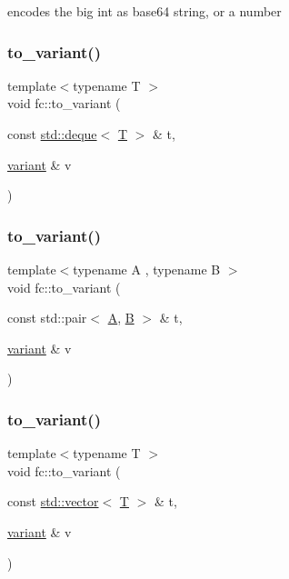 encodes the big int as base64 string, or a number \mbox{\label{namespacefc_ad2c253eb956ce0781fde7ce73d3ff1c8}} 
\subsubsection{\texorpdfstring{to\+\_\+variant()}{to\_variant()}\hspace{0.1cm}{\footnotesize\ttfamily [6/8]}}
{\footnotesize\ttfamily template$<$typename T $>$ \\
void fc\+::to\+\_\+variant (\begin{DoxyParamCaption}\item[{const \mbox{\hyperlink{classstd_1_1deque}{std\+::deque}}$<$ \mbox{\hyperlink{struct_t}{T}} $>$ \&}]{t,  }\item[{\mbox{\hyperlink{classfc_1_1variant}{variant}} \&}]{v }\end{DoxyParamCaption})}

\mbox{\label{namespacefc_aeab321dab5b5322bf879f7a752c0784a}} 
\subsubsection{\texorpdfstring{to\+\_\+variant()}{to\_variant()}\hspace{0.1cm}{\footnotesize\ttfamily [7/8]}}
{\footnotesize\ttfamily template$<$typename A , typename B $>$ \\
void fc\+::to\+\_\+variant (\begin{DoxyParamCaption}\item[{const std\+::pair$<$ \mbox{\hyperlink{struct_a}{A}}, \mbox{\hyperlink{struct_b}{B}} $>$ \&}]{t,  }\item[{\mbox{\hyperlink{classfc_1_1variant}{variant}} \&}]{v }\end{DoxyParamCaption})}

\mbox{\label{namespacefc_a54785a3ab06495c41ff38fccf39d837c}} 
\subsubsection{\texorpdfstring{to\+\_\+variant()}{to\_variant()}\hspace{0.1cm}{\footnotesize\ttfamily [8/8]}}
{\footnotesize\ttfamily template$<$typename T $>$ \\
void fc\+::to\+\_\+variant (\begin{DoxyParamCaption}\item[{const \mbox{\hyperlink{classstd_1_1vector}{std\+::vector}}$<$ \mbox{\hyperlink{struct_t}{T}} $>$ \&}]{t,  }\item[{\mbox{\hyperlink{classfc_1_1variant}{variant}} \&}]{v }\end{DoxyParamCaption})}


